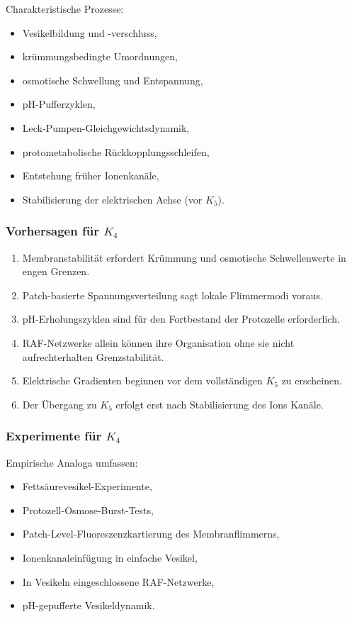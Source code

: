 Charakteristische Prozesse:
\begin{itemize}
    \item Vesikelbildung und -verschluss,
    \item krümmungsbedingte Umordnungen,
    \item osmotische Schwellung und Entspannung,
    \item pH-Pufferzyklen,
    \item Leck-Pumpen-Gleichgewichtsdynamik,
    \item protometabolische Rückkopplungsschleifen,
    \item Entstehung früher Ionenkanäle,
    \item Stabilisierung der elektrischen Achse (vor $K_5$).
\end{itemize}

\subsubsection{Vorhersagen für \texorpdfstring{$K_4$}{K_4}}

\begin{enumerate}
    \item Membranstabilität erfordert Krümmung und osmotische Schwellenwerte
          in engen Grenzen.
    \item Patch-basierte Spannungsverteilung sagt lokale Flimmermodi voraus.
    \item pH-Erholungszyklen sind für den Fortbestand der Protozelle erforderlich.
    \item RAF-Netzwerke allein können ihre Organisation ohne sie nicht aufrechterhalten
          Grenzstabilität.
    \item Elektrische Gradienten beginnen vor dem vollständigen $K_5$ zu erscheinen.
    \item Der Übergang zu $K_5$ erfolgt erst nach Stabilisierung des Ions
          Kanäle.
\end{enumerate}

\subsubsection{Experimente für \texorpdfstring{$K_4$}{K_4}}

Empirische Analoga umfassen:
\begin{itemize}
    \item Fettsäurevesikel-Experimente,
    \item Protozell-Osmose-Burst-Tests,
    \item Patch-Level-Fluoreszenzkartierung des Membranflimmerns,
    \item Ionenkanaleinfügung in einfache Vesikel,
    \item In Vesikeln eingeschlossene RAF-Netzwerke,
    \item pH-gepufferte Vesikeldynamik.
\end{itemize}

